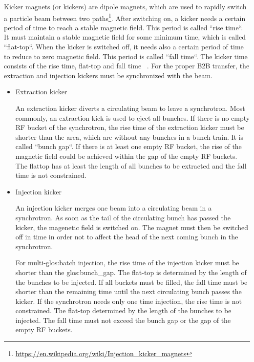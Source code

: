 Kicker magnets (or kickers) are dipole magnets, which are used to rapidly switch a particle beam between two paths\footnote{\url{https://en.wikipedia.org/wiki/Injection_kicker_magnets}}. After switching on, a kicker needs a certain period of time to reach a stable magnetic field. This period is called ``rise time``.  It must maintain a stable magnetic field for some minimum time, which is called ``flat-top``. When the kicker is switched off, it needs also a certain period of time to reduce to zero magnetic field. This period is called ``fall time``. The kicker time consists of the rise time, flat-top and fall time ~\cite{udo_injection_2014}. For the proper B2B transfer, the extraction and injection kickers must be synchronized with the beam. 

 
\begin{itemize}
	\item Extraction kicker

An extraction kicker diverts a circulating beam to leave a synchrotron. Most commonly, an extraction kick is used to eject all bunches. If there is no empty RF bucket of the synchrotron, the rise time of the extraction kicker must be shorter than the area, which are without any bunches in a bunch train. It is called ``bunch gap``. If there is at least one empty RF bucket, the rise of the magnetic field could be achieved within the gap of the empty RF buckets. The flattop has at least the length of all bunches to be extracted and the fall time is not constrained. 
		  

	\item Injection kicker

An injection kicker merges one beam into a circulating beam in a synchrotron. As soon as the tail of the circulating bunch has passed the kicker, the magenetic field is switched on. The magnet must then be switched off in time in order not to affect the head of the next coming bunch in the synchrotron.

For multi-\gls{glos:batch} injection, the rise time of the injection kicker must be shorter than the \gls{glos:bunch_gap}. The flat-top is determined by the length of the bunches to be injected. If all buckets must be filled, the fall time must be shorter than the remaining time until the next circulating bunch passes the kicker. If the synchrotron needs only one time injection, the rise time is not constrained. The flat-top determined by the length of the bunches to be injected. The fall time must not exceed the bunch gap or the gap of the empty RF buckets. 

\end{itemize}

